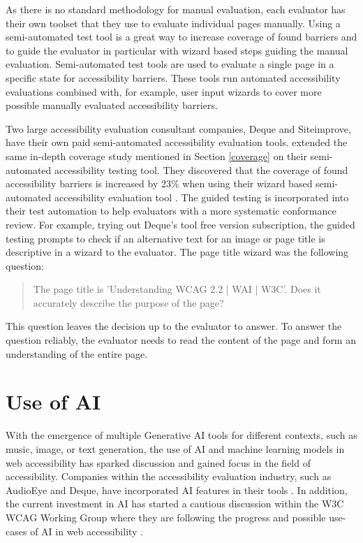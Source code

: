 As there is no standard methodology for manual evaluation, each evaluator has their own toolset that they use to evaluate individual pages manually. Using a semi-automated test tool is a great way to increase coverage of found barriers and to guide the evaluator in particular with wizard based steps guiding the manual evaluation. Semi-automated test tools are used to evaluate a single page in a specific state for accessibility barriers. These tools run automated accessibility evaluations combined with, for example, user input wizards to cover more possible manually evaluated accessibility barriers. 

Two large accessibility evaluation consultant companies, Deque and Siteimprove, have their own paid semi-automated accessibility evaluation tools. \textcite{dequecoverage_semi} extended the same in-depth coverage study mentioned in Section \ref{coverage} on their semi-automated accessibility testing tool. They discovered that the coverage of found accessibility barriers is increased by 23\% when using their wizard based semi-automated accessibility evaluation tool \citep{dequecoverage_semi}. The guided testing is incorporated into their test automation to help evaluators with a more systematic conformance review. For example, trying out Deque's tool free version subscription, the guided testing prompts to check if an alternative text for an image or page title is descriptive in a wizard to the evaluator. The page title wizard was the following question: \blockquote{The page title is 'Understanding WCAG 2.2 | WAI | W3C'. Does it accurately describe the purpose of the page?}. This question leaves the decision up to the evaluator to answer. To answer the question reliably, the evaluator needs to read the content of the page and form an understanding of the entire page.

\section{Use of AI}

With the emergence of multiple Generative AI tools for different contexts, such as music, image, or text generation, the use of AI and machine learning models in web accessibility has sparked discussion and gained focus in the field of accessibility. Companies within the accessibility evaluation industry, such as AudioEye and Deque, have incorporated AI features in their tools \citep{deque_igt, boia_improve_accessibility}. In addition, the current investment in AI has started a cautious discussion within the W3C WCAG Working Group where they are following the progress and possible use-cases of AI in web accessibility \citep{ai_wcag_email}. 


